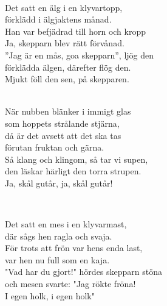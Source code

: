  \\       

\songtext{}Det satt en älg i en klyvartopp,\\
förklädd i älgjaktens månad.\\
Han var befjädrad till horn och kropp\\ 
Ja, skepparn blev rätt förvånad.\\
”Jag är en mås, goa skepparn”, ljög den\\ 
förklädda älgen, därefter flög den.\\ 
Mjukt föll den sen, på skepparen. \\


 \\       

\songtext{}När nubben blänker i immigt glas \\
som hoppets strålande stjärna, \\
då är det avsett att det ska tas \\
förutan fruktan och gärna. \\
Så klang och klingom, så tar vi supen, \\
den läskar härligt den torra strupen. \\
Ja, skål gutår, ja, skål gutår! \\


\newpage


 \\       

\songtext{}Det satt en mes i en klyvarmast,\\
där sågs hen ragla och svaja.\\
För trots att frön var hens enda last,\\
var hen nu full som en kaja.\\
"Vad har du gjort!" hördes skepparn stöna\\
och mesen svarte: "Jag rökte fröna!\\
I egen holk, i egen holk" \\


 \\       
\author{Text: Jacke}

